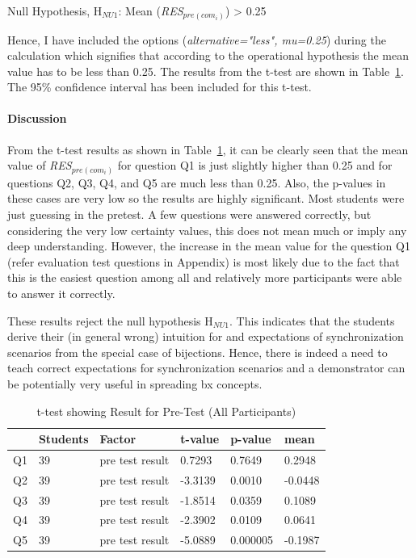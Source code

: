 Null Hypothesis, {H$_{NU1}$}: Mean (\textit{RES$_{pre(com_i)}$}) > 0.25 

Hence, I have included the options (\textit{alternative="less", mu=0.25}) during the calculation which signifies that according to the operational hypothesis the mean value has to be less than 0.25. The results from the t-test are shown in Table~\ref{tab:t-test_PreTest}. The 95\% confidence interval has been included for this t-test.

\paragraph{Discussion}
From the t-test results as shown in Table~\ref{tab:t-test_PreTest}, it can be clearly seen that the mean value of \textit{RES$_{pre(com_i)}$} for question Q1 is just slightly higher than 0.25 and for questions Q2, Q3, Q4, and Q5 are much less than 0.25. Also, the p-values in these cases are very low so the results are highly significant. Most students were just guessing in the pretest.  A few questions were answered correctly, but considering the very low certainty values, this does not mean much or imply any deep understanding. However, the increase in the mean value for the question Q1 (refer evaluation test questions in Appendix) is most likely due to the fact that this is the easiest question among all and relatively more participants were able to answer it correctly.

These results reject the null hypothesis {H$_{NU1}$}. This indicates that the students derive their (in general wrong) intuition for and expectations of synchronization scenarios from the special case of bijections. Hence, there is indeed a need to teach correct expectations for synchronization scenarios and a demonstrator can be potentially very useful in spreading bx concepts.

\begin{table}[ht]
	\centering	
	\begin{tabular}{|p{1cm}|p{1.5cm}|p{4cm}|p{1.5cm}|p{1.5cm}|p{1.5cm}|}
		\hline
		\rowcolor[gray]{.8}	
		\textbf{} & \textbf{Students} & \textbf{Factor} & \textbf{t-value} & \textbf{p-value} & \textbf{mean}\\
		\hline
		Q1 & 39 & pre test result & 0.7293 & 0.7649 & 0.2948\\
		\hline
		Q2 & 39 & pre test result & -3.3139 & 0.0010 & -0.0448\\
		\hline
		Q3 & 39 & pre test result & -1.8514 & 0.0359 & 0.1089\\
		\hline	
		Q4 & 39 & pre test result & -2.3902 & 0.0109 & 0.0641\\
		\hline
		Q5 & 39 & pre test result & -5.0889 & 0.000005 & -0.1987\\
		\hline			
	\end{tabular}
	\caption{t-test showing Result for Pre-Test (All Participants)}
	\label{tab:t-test_PreTest}
\end{table}


